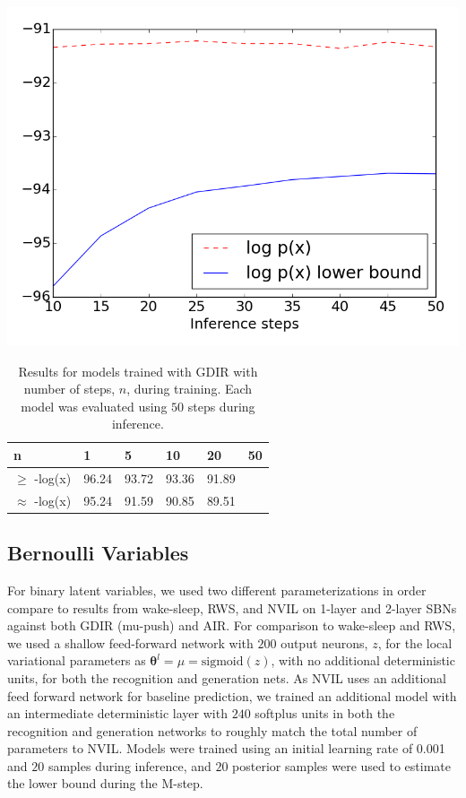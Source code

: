 \documentclass{article} %
\newcommand{\vects}[1]{\boldsymbol{#1}}
\newcommand{\TT}[0]{\vects{\theta}}
\newcommand{\sigmoid}{\text{sigmoid}}
\begin{document}
\begin{minipage}{\textwidth}
\begin{minipage}[r]{0.43\textwidth}
        \includegraphics[scale=0.3]{figures/continuous_eval}
        \label{fig:continuous}
        \end{minipage}
\end{minipage}

\begin{table}
\begin{tabular}{ | m{1.4cm} | m{1cm} | m{1cm} | m{1cm} | m{1cm} | m{1cm} |}
\hline
n & 1 & 5 & 10 & 20 & 50 \\
\hline
$\ge$ -log(x) & 96.24 & 93.72 & 93.36 & 91.89 & \\
\hline
$\approx$ -log(x) & 95.24 & 91.59 & 90.85 & 89.51 & \\
\hline
\end{tabular}
\caption{Results for models trained with GDIR with number of steps, $n$, during training. Each model was evaluated using $50$ steps during inference.}
\label{table:cont_step}
\end{table}

\subsection{Bernoulli Variables}
For binary latent variables, we used two different parameterizations in order compare to results from wake-sleep, RWS, and
NVIL on 1-layer and 2-layer SBNs against both GDIR (mu-push) and AIR. For comparison to wake-sleep and RWS, we used a shallow
feed-forward network with $200$ output neurons, $z$, for the local variational parameters as $\TT^l = \mu = \sigmoid(z)$, with no additional deterministic units, for both the recognition and generation nets.
As NVIL uses an additional feed forward network for baseline prediction, we trained an additional model with
an intermediate deterministic layer with $240$ softplus units in both the recognition and generation
networks to roughly match the total number of parameters to NVIL. Models
were trained using an initial learning rate of \num{0.001} and $20$ samples
during inference, and $20$ posterior samples were used to estimate the lower bound during the
M-step.
\end{document}

